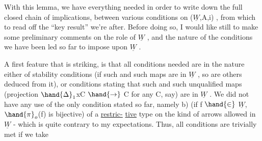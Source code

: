 With this lemma, we have everything needed in order to write down
the full closed chain of implications, between various conditions on
($\underline{W}$,A,i) , from which to read off the ``key result'' we're after. Before
doing so, I would like still to make some preliminary comments on the
role of $\underline{W}$ , and  the nature of the conditions we have been led so far to
impose upon $\underline{W}$ .

A first feature that is striking, is that all conditions needed
are in the nature either of stability conditions (if such and such maps
are in $\underline{W}$ , so are others deduced from it), or conditions stating that
such and such unqualified maps (projection $\hand{\Delta}_{1}$xC $\hand{\to}$ C for any C,
say) are in $\underline{W}$ . We did not have any use of the only condition stated
so far, namely b) (if f $\hand{\in}$ $\underline{W}$, $\hand{\pi}_{o}$(f) is bijective)  of a \uline{restric-}%
\uline{tive} type on the kind of arrows allowed in $\underline{W}$ - which is quite contrary
to my expectations. Thus, all conditions are trivially met if we take

